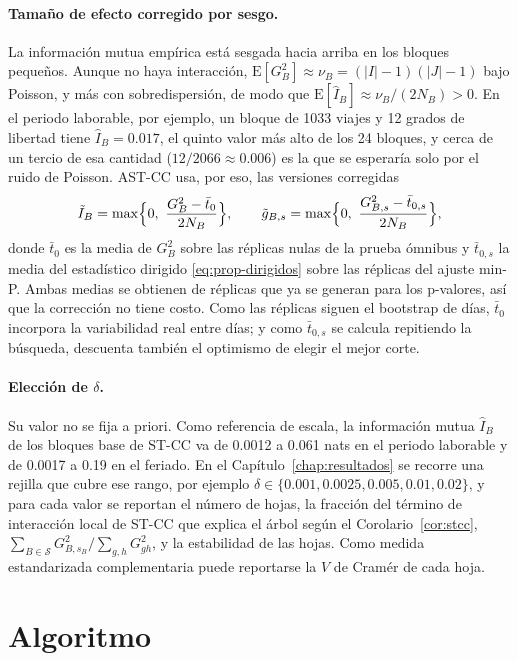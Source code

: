 \paragraph{Tamaño de efecto corregido por sesgo.} La información mutua empírica
está sesgada hacia arriba en los bloques pequeños. Aunque no haya interacción,
$\mathrm{E}[G^2_B]\approx\nu_B = (|I|-1)(|J|-1)$ bajo Poisson, y más con
sobredispersión, de modo que $\mathrm{E}[\hat I_B]\approx \nu_B/(2N_B) > 0$. En el
periodo laborable, por ejemplo, un bloque de 1033 viajes y 12 grados de
libertad tiene $\hat I_B = 0.017$, el quinto valor más alto de los 24 bloques,
y cerca de un tercio de esa cantidad ($12/2066\approx 0.006$) es la que se
esperaría solo por el ruido de Poisson. AST-CC usa, por eso, las versiones
corregidas
\begin{equation}\label{eq:prop-efecto-corregido}
  \tilde I_B = \max\Bigl\{0,\ \frac{G^2_B - \bar t_0}{2N_B}\Bigr\},
  \qquad
  \tilde g_{B,s} = \max\Bigl\{0,\ \frac{G^2_{B,s} - \bar t_{0,s}}{2N_B}\Bigr\},
\end{equation}
donde $\bar t_0$ es la media de $G^2_B$ sobre las réplicas nulas de la prueba
ómnibus y $\bar t_{0,s}$ la media del estadístico dirigido
\eqref{eq:prop-dirigidos} sobre las réplicas del ajuste min-P. Ambas medias se
obtienen de réplicas que ya se generan para los p-valores, así que la corrección
no tiene costo. Como las réplicas siguen el bootstrap de días, $\bar t_0$
incorpora la variabilidad real entre días; y como $\bar t_{0,s}$ se calcula repitiendo la
búsqueda, descuenta también el optimismo de elegir el mejor corte.

\paragraph{Elección de $\delta$.} Su valor no se fija a priori. Como referencia
de escala, la información mutua $\hat I_B$ de los bloques base de ST-CC va de
0.0012 a 0.061 nats en el periodo laborable y de 0.0017 a 0.19 en el feriado.
En el Capítulo~\ref{chap:resultados} se recorre una rejilla que cubre ese rango,
por ejemplo $\delta\in\{0.001, 0.0025, 0.005, 0.01, 0.02\}$, y para cada valor
se reportan el número de hojas, la fracción del término de interacción local de
ST-CC que explica el árbol según el Corolario~\ref{cor:stcc},
$\sum_{B\in\mathcal{S}}G^2_{B,s_B}\big/\sum_{g,h}G^2_{gh}$, y la estabilidad de
las hojas. Como medida estandarizada complementaria puede reportarse la $V$ de
Cramér de cada hoja.

\section{Algoritmo}\label{sec:prop-algoritmo}

